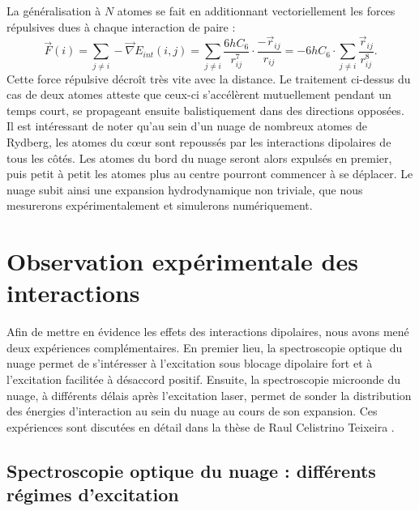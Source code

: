 La généralisation à $N$ atomes se fait en additionnant vectoriellement les forces répulsives dues à chaque interaction de paire :
\begin{equation}
\label{eq:repuls_Natomes}
\vec{F}(i) =  \sum_{j\neq i} -\vec{\nabla}E_{int}(i,j)
= \sum_{j\neq i} \frac{6hC_6}{r_{ij}^7} \cdot \frac{-\vec{r}_{ij}}{r_{ij}}
= - 6hC_6 \cdot \sum_{j\neq i} \frac{\vec{r}_{ij}}{r_{ij}^8}.
\end{equation}
%
Cette force répulsive décroît très vite avec la distance.
Le traitement ci-dessus du cas de deux atomes atteste que
ceux-ci s'accélèrent mutuellement pendant un temps court, se propageant ensuite balistiquement dans des directions opposées.
Il est intéressant de noter qu'au sein d'un nuage de nombreux atomes de Rydberg, les atomes du c\oe ur  sont repoussés par les interactions dipolaires de tous les côtés.
Les atomes du bord du nuage seront alors expulsés en premier, puis petit à petit les atomes plus au centre pourront commencer à se déplacer.
Le nuage subit ainsi une expansion hydrodynamique non triviale, que nous mesurerons expérimentalement et simulerons numériquement.


\section{Observation expérimentale des interactions}
\noindent Afin de mettre en évidence les effets des interactions dipolaires, nous avons mené deux expériences complémentaires.
En premier lieu, la spectroscopie optique du nuage permet de s'intéresser à l'excitation sous blocage dipolaire fort et à l'excitation facilitée à désaccord positif.
Ensuite, la spectroscopie microonde du nuage, à différents délais après l'excitation laser, permet de sonder la distribution des énergies d'interaction au sein du nuage au cours de son expansion.
Ces expériences sont discutées en détail dans la thèse de Raul Celistrino Teixeira \cite{PHD_CELISTRINO}.

	\subsection{Spectroscopie optique du nuage : différents régimes d'excitation}\label{subsec:optical_spectra}
